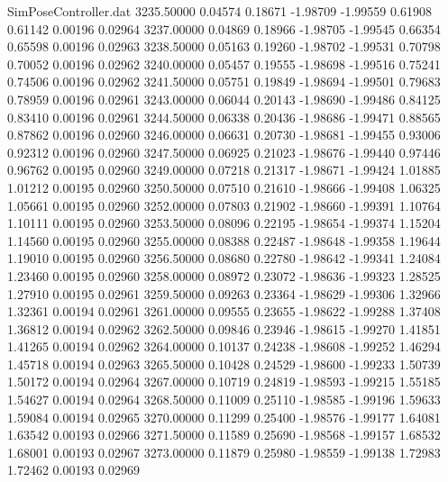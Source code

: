 \begin{filecontents}{SimPoseController.dat}
3235.50000    0.04574    0.18671    -1.98709   -1.99559    0.61908    0.61142    0.00196    0.02964
3237.00000    0.04869    0.18966    -1.98705   -1.99545    0.66354    0.65598    0.00196    0.02963
3238.50000    0.05163    0.19260    -1.98702   -1.99531    0.70798    0.70052    0.00196    0.02962
3240.00000    0.05457    0.19555    -1.98698   -1.99516    0.75241    0.74506    0.00196    0.02962
3241.50000    0.05751    0.19849    -1.98694   -1.99501    0.79683    0.78959    0.00196    0.02961
3243.00000    0.06044    0.20143    -1.98690   -1.99486    0.84125    0.83410    0.00196    0.02961
3244.50000    0.06338    0.20436    -1.98686   -1.99471    0.88565    0.87862    0.00196    0.02960
3246.00000    0.06631    0.20730    -1.98681   -1.99455    0.93006    0.92312    0.00196    0.02960
3247.50000    0.06925    0.21023    -1.98676   -1.99440    0.97446    0.96762    0.00195    0.02960
3249.00000    0.07218    0.21317    -1.98671   -1.99424    1.01885    1.01212    0.00195    0.02960
3250.50000    0.07510    0.21610    -1.98666   -1.99408    1.06325    1.05661    0.00195    0.02960
3252.00000    0.07803    0.21902    -1.98660   -1.99391    1.10764    1.10111    0.00195    0.02960
3253.50000    0.08096    0.22195    -1.98654   -1.99374    1.15204    1.14560    0.00195    0.02960
3255.00000    0.08388    0.22487    -1.98648   -1.99358    1.19644    1.19010    0.00195    0.02960
3256.50000    0.08680    0.22780    -1.98642   -1.99341    1.24084    1.23460    0.00195    0.02960
3258.00000    0.08972    0.23072    -1.98636   -1.99323    1.28525    1.27910    0.00195    0.02961
3259.50000    0.09263    0.23364    -1.98629   -1.99306    1.32966    1.32361    0.00194    0.02961
3261.00000    0.09555    0.23655    -1.98622   -1.99288    1.37408    1.36812    0.00194    0.02962
3262.50000    0.09846    0.23946    -1.98615   -1.99270    1.41851    1.41265    0.00194    0.02962
3264.00000    0.10137    0.24238    -1.98608   -1.99252    1.46294    1.45718    0.00194    0.02963
3265.50000    0.10428    0.24529    -1.98600   -1.99233    1.50739    1.50172    0.00194    0.02964
3267.00000    0.10719    0.24819    -1.98593   -1.99215    1.55185    1.54627    0.00194    0.02964
3268.50000    0.11009    0.25110    -1.98585   -1.99196    1.59633    1.59084    0.00194    0.02965
3270.00000    0.11299    0.25400    -1.98576   -1.99177    1.64081    1.63542    0.00193    0.02966
3271.50000    0.11589    0.25690    -1.98568   -1.99157    1.68532    1.68001    0.00193    0.02967
3273.00000    0.11879    0.25980    -1.98559   -1.99138    1.72983    1.72462    0.00193    0.02969

\end{filecontents}
